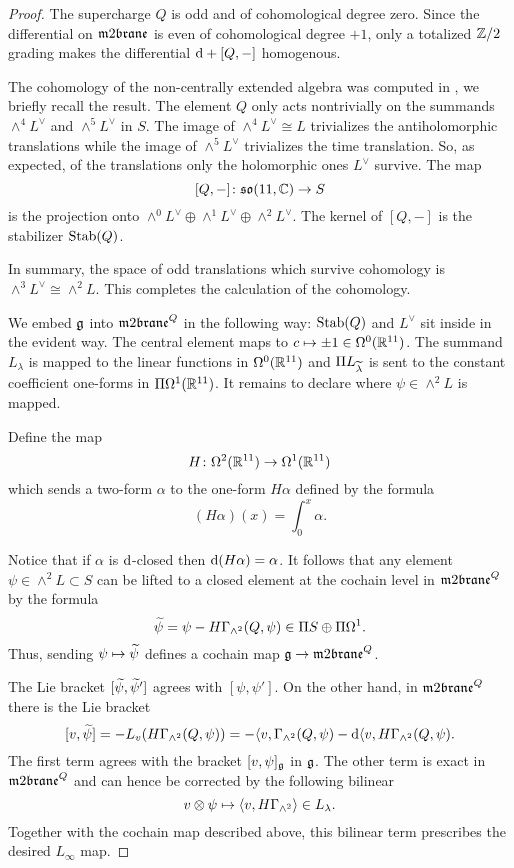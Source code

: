 \documentclass[11pt]{amsart}
\begin{document}
\begin{proof}
The supercharge $Q$ is odd and of cohomological degree zero.
Since the differential on $\m2$ is even of cohomological degree $+1$, only a totalized $\ZZ/2$ grading makes the differential $\d + [Q,-]$ homogenous. 

The cohomology of the non-centrally extended algebra was computed in \cite{SWpure}, we briefly recall the result. 
The element $Q$ only acts nontrivially on the summands $\wedge^4 L^\vee$ and $\wedge^5 L^\vee$ in $S$. 
The image of $\wedge^4 L^\vee \cong L$ trivializes the antiholomorphic translations while the image of $\wedge^5 L^\vee$ trivializes the time translation.
So, as expected, of the translations only the holomorphic ones $L^\vee$ survive.
The map 
\[
[Q,-] \colon \lie{so}(11,\CC) \to S 
\] 
is the projection onto $\wedge^0 L^\vee \oplus \wedge^1 L^\vee \oplus \wedge^2 L^\vee$. 
The kernel of $[Q,-]$ is the stabilizer ${\rm Stab}(Q)$.

In summary, the space of odd translations which survive cohomology is $\wedge^3 L^\vee \cong \wedge^2 L$.
This completes the calculation of the cohomology. 

We embed $\fg$ into $\m2^Q$ in the following way: ${\rm Stab}(Q)$ and $L^\vee$ sit inside in the evident way.
The central element maps to $c \mapsto \pm 1 \in \Omega^0(\RR^{11})$.
The summand $L_\lambda$ is mapped to the linear functions in $\Omega^0(\RR^{11})$ and $\Pi L_{\Tilde{\lambda}}$ is sent to the constant coefficient one-forms in $\Pi \Omega^1(\RR^{11})$. 
It remains to declare where $\psi \in \wedge^2 L$ is mapped.

Define the map
\[
H \colon \Omega^2 (\RR^{11}) \to \Omega^1(\RR^{11})
\]
which sends a two-form $\alpha$ to the one-form $H \alpha$ defined by the formula
\[
(H \alpha) (x) = \int_0^x \alpha .
\]

Notice that if $\alpha$ is $\d$-closed then $\d (H \alpha) = \alpha$. 
It follows that any element $\psi \in \wedge^2 L \subset S$ can be lifted to a closed element at the cochain level in $\m2^Q$ by the formula
\[
\Tilde{\psi} = \psi - H \Gamma_{\wedge^2} (Q, \psi) \in \Pi S \oplus \Pi \Omega^1 .
\]
Thus, sending $\psi \mapsto \Tilde{\psi}$ defines a cochain map $\fg \to \m2^Q$. 

The Lie bracket $[\Tilde{\psi}, \Tilde{\psi}']$ agrees with $[\psi, \psi']$. 
On the other hand, in $\m2^Q$ there is the Lie bracket 
\[
[v,\Tilde{\psi}] = - L_v (H \Gamma_{\wedge^2} (Q, \psi)) = -\<v, \Gamma_{\wedge^2}(Q, \psi) - \d \<v, H \Gamma_{\wedge^2}(Q, \psi) .
\]
The first term agrees with the bracket $[v, \psi]_{\fg}$ in $\fg$. 
The other term is exact in $\m2^Q$ and can hence be corrected by the following bilinear  
\[
v \otimes \psi \mapsto \<v, H \Gamma_{\wedge^2} \> \in L_\lambda .
\] 
Together with the cochain map described above, this bilinear term prescribes the desired $L_\infty$ map. 

\end{proof}
\end{document}
